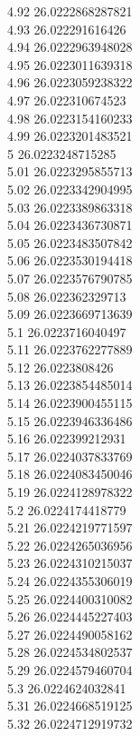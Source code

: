 {4.92	26.0222868287821\\
4.93	26.022291616426\\
4.94	26.0222963948028\\
4.95	26.0223011639318\\
4.96	26.0223059238322\\
4.97	26.022310674523\\
4.98	26.0223154160233\\
4.99	26.0223201483521\\
5	26.0223248715285\\
5.01	26.0223295855713\\
5.02	26.0223342904995\\
5.03	26.0223389863318\\
5.04	26.0223436730871\\
5.05	26.0223483507842\\
5.06	26.0223530194418\\
5.07	26.0223576790785\\
5.08	26.022362329713\\
5.09	26.0223669713639\\
5.1	26.0223716040497\\
5.11	26.0223762277889\\
5.12	26.0223808426\\
5.13	26.0223854485014\\
5.14	26.0223900455115\\
5.15	26.0223946336486\\
5.16	26.022399212931\\
5.17	26.0224037833769\\
5.18	26.0224083450046\\
5.19	26.0224128978322\\
5.2	26.0224174418779\\
5.21	26.0224219771597\\
5.22	26.0224265036956\\
5.23	26.0224310215037\\
5.24	26.0224355306019\\
5.25	26.0224400310082\\
5.26	26.0224445227403\\
5.27	26.0224490058162\\
5.28	26.0224534802537\\
5.29	26.0224579460704\\
5.3	26.0224624032841\\
5.31	26.0224668519125\\
5.32	26.0224712919732\\
}
